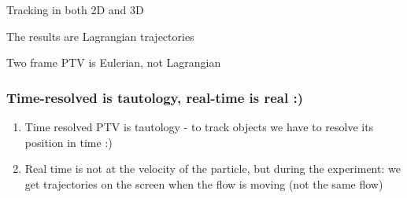 \begin{frame}[label=ptv-61]{Tracking in both 2D and 3D}
	\centering{}
\end{frame}

			

\begin{frame}[label=ptv-7]{The results are Lagrangian trajectories}
\begin{multicols}{2}
\centering
{}
\end{multicols}
\end{frame}

\begin{frame}[label=ptv-71]{Two frame PTV is Eulerian, not Lagrangian}
\centering{}
\end{frame}

\begin{frame}[label=ptv-8]
\frametitle{Time-resolved is tautology, real-time is real :) }
\begin{enumerate}
\item Time resolved PTV is tautology - to track objects we have to resolve its position in time :) 
\item Real time is not at the velocity of the particle, but during the experiment: we get trajectories on the screen when the flow is moving (not the same flow)
\end{enumerate}
\end{frame}

